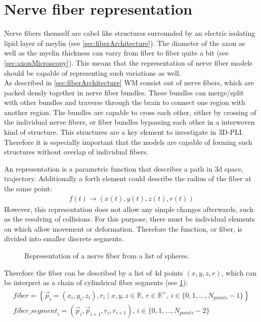 \section{Nerve fiber representation}
\label{sec:nerve_fiber_representation}
%
Nerve fibers themself are cabel like structures surrounded by an electric isolating lipid layer of meylin (see \cref{sec:fiberArchitecture}).
The diameter of the axon as well as the myelin thickness can varry from fiber to fiber quite a bit (see \cref{sec:axonMicroscopy}).
This means that the representation of nerve fiber models should be capable of representing such variations as well.\\
%
As described in \cref{sec:fiberArchitecture} \ac{WM} consist out of nerve fibers, which are packed densly together in nerve fiber bundles.
These bundles can merge/split with other bundles and traverse through the brain to connect one region with another region.
The bundles are capable to cross each other, either by crossing of the individual nerve fibers, or fiber bundles bypassing each other in a interwoven kind of structure.
This structures are a key element to investigate in \ac{3D-PLI}.
Therefore it is especially important that the models are capable of forming such structures without overlap of individual fibers.
\par
%
An representation is a parametric function that describes a path in 3d space, \ie{} trajectory.
Additionally a forth element could describe the radius of the fiber at the same point:
\begin{align}
f(t) \rightarrow (x(t),y(t), z(t), r(t))
\end{align}
However, this representation does not allow any simple changes afterwards, such as the resolving of collisions.
For this purpose, there must be individual elements on which allow movement or deformation.
Therefore the function, or fiber, is divided into smaller discrete segments.
%
\begin{figure}[!t]
    \setlength{\tikzwidth}{0.85\textwidth}
    \centering
	\caption[]{Representation of a nerve fiber from a list of spheres.}
	\label{fig:fiberReb}
\end{figure}
%
Therefore the fiber can be described by a list of 4d points $(x,y,z,r)$, which can be interpret as a chain of cylindrical fiber segments (see \cref{fig:fiberReb}):
\begin{align}
\begin{split}
\mathit{fiber} = \left\{ \vec{p}_i=(x_i,y_i,z_i), r_i \mid x,y,z \in \mathbb{R}, \, r \in \mathbb{R^+}, \, i \in \{0,1,...,N_{\mathit{points}}-1\}\right\} \\
\mathit{fiber\_segment}_i = (\vec{p}_i, \vec{p}_{i+1}, r_i, r_{i+1}), \, i \in \{0,1,...,N_{\mathit{points}}-2\}
\end{split}
\end{align}
